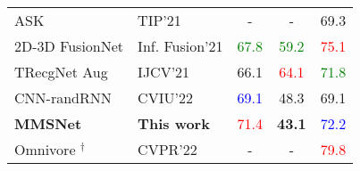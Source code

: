 \begin{table}[!h]
\begin{center}
\begin{adjustbox}{width=\columnwidth}
\begin{tabular}{ llccc }
				ASK \citep{2021_TIP_Xiong}  						& TIP'21		& - 				& -	        		& 69.3 	\\
				2D-3D FusionNet \citep{2021_IF_Montoro}  			& Inf. Fusion'21& \bftab\textcolor{green}{67.8} 				& \bftab\textcolor{green}{59.2}	        	& \bftab\textcolor{red}{75.1} 	\\
				TRecgNet Aug \citep{2021_IJCV_Du}  					& IJCV'21		& 66.1 				& \bftab\textcolor{red}{64.1}	        	& \bftab\textcolor{green}{71.8} 	\\
				CNN-randRNN \citep{2022_CVIU_Caglayan}         		& CVIU'22		& \bftab\textcolor{blue}{69.1} 				& 48.3 	        	& 69.1 	\\ 
				\textbf{MMSNet}  									& \textbf{This work}		& \bftab\textcolor{red}{71.4}		& \textbf{43.1}  	& \bftab\textcolor{blue}{72.2} \\ \hline
				Omnivore \citep{2022_CVPR_Girdhar} $^\dagger$		& CVPR'22			& - 				&- 				& \bftab\textcolor{red}{79.8} 		\\
				\hline
			\end{tabular}
		\end{adjustbox}
		\label{table:nyuv2Results}
	\end{center}
\end{table}